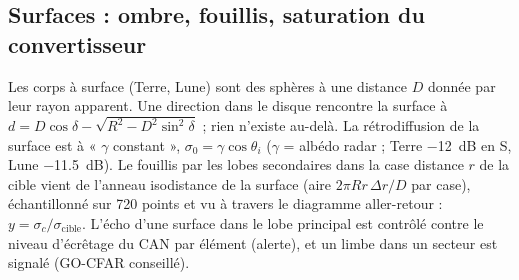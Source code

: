 \documentclass[11pt,a4paper]{article}
\begin{document}
\subsection{Surfaces : ombre, fouillis, saturation du convertisseur}
Les corps à surface (Terre, Lune) sont des sphères à une distance $D$ donnée par leur rayon apparent. Une direction
dans le disque rencontre la surface à $d = D\cos\delta - \sqrt{R^2 - D^2\sin^2\delta}$ ; rien n'existe au-delà. La
rétrodiffusion de la surface est à « $\gamma$ constant », $\sigma_0 = \gamma\cos\theta_i$ ($\gamma$ = albédo radar ;
Terre \SI{-12}{dB} en S, Lune \SI{-11.5}{dB}). Le fouillis par les lobes secondaires dans la case distance $r$ de la
cible vient de l'anneau isodistance de la surface (aire $2\pi R r\,\Delta r/D$ par case), échantillonné sur 720 points
et vu à travers le diagramme aller-retour : $y = \sigma_c/\sigma_{\mathrm{cible}}$. L'écho d'une surface dans le lobe
principal est contrôlé contre le niveau d'écrêtage du CAN par élément (alerte), et un limbe dans un secteur est signalé
(GO-CFAR conseillé).
\end{document}
